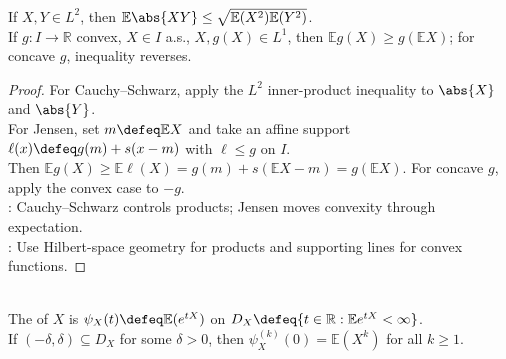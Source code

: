 \begin{theorem} \label{thm:cauchy-schwarz-and-jensen-expectations} \\
If $X,Y\in L^2$, then $\mathbb{E}\abs{XY}\leq\sqrt{\mathbb{E}(X^2)\mathbb{E}(Y^2)}$.\\
If $g:I\to\mathbb{R}$ convex, $X\in I$ a.s., $X,g(X)\in L^1$, then $\mathbb{E}g(X)\geq g(\mathbb{E}X)$; for concave $g$, inequality reverses.
\begin{proof}
For Cauchy--Schwarz, apply the $L^2$ inner-product inequality to $\abs{X}$ and $\abs{Y}$.\\
For Jensen, set $m\defeq\mathbb{E}X$ and take an affine support $\ell(x)\defeq g(m)+s(x-m)$ with $\ell\leq g$ on $I$.\\
Then $\mathbb{E}g(X)\geq\mathbb{E}\ell(X)=g(m)+s(\mathbb{E}X-m)=g(\mathbb{E}X)$. For concave $g$, apply the convex case to $-g$.\\
: Cauchy--Schwarz controls products; Jensen moves convexity through expectation.\\
: Use Hilbert-space geometry for products and supporting lines for convex functions.
\end{proof}
\end{theorem}

\begin{definition} \label{def:moment-generating-function} \\
The  of $X$ is $\psi_X(t)\defeq\mathbb{E}(e^{tX})$ on $D_X\defeq\{t\in\mathbb{R}:\mathbb{E}e^{tX}<\infty\}$.\\
If $(-\delta,\delta)\subseteq D_X$ for some $\delta>0$, then $\psi_X^{(k)}(0)=\mathbb{E}(X^k)$ for all $k\geq1$.
\end{definition}

